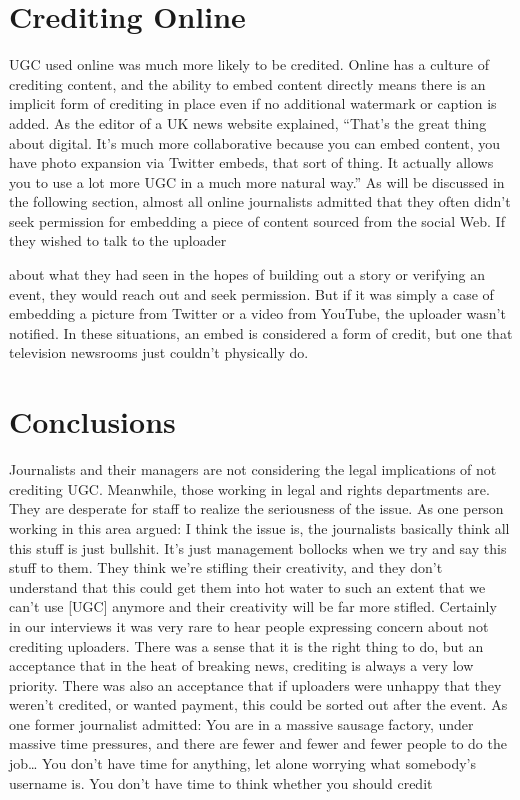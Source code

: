 \begin{enumerate}
\section{Crediting Online}
UGC used online was much more likely to be credited. Online has a culture
of crediting content, and the ability to embed content directly means there
is an implicit form of crediting in place even if no additional watermark or
caption is added.
As the editor of a UK news website explained, ``That's the great thing about
digital. It's much more collaborative because you can embed content, you
have photo expansion via Twitter embeds, that sort of thing. It actually
allows you to use a lot more UGC in a much more natural way.''
As will be discussed in the following section, almost all online journalists
admitted that they often didn't seek permission for embedding a piece of
content sourced from the social Web. If they wished to talk to the uploader

about what they had seen in the hopes of building out a story or verifying an
event, they would reach out and seek permission. But if it was simply a case
of embedding a picture from Twitter or a video from YouTube, the uploader
wasn't notified. In these situations, an embed is considered a form of credit,
but one that television newsrooms just couldn't physically do.
\section{Conclusions}
Journalists and their managers are not considering the legal implications of
not crediting UGC. Meanwhile, those working in legal and rights departments
are. They are desperate for staff to realize the seriousness of the issue.
As one person working in this area argued:
I think the issue is, the journalists basically think all this stuff is just
bullshit. It's just management bollocks when we try and say this stuff
to them. They think we're stifling their creativity, and they don't
understand that this could get them into hot water to such an extent
that we can't use [UGC] anymore and their creativity will be far
more stifled.
Certainly in our interviews it was very rare to hear people expressing concern
about not crediting uploaders. There was a sense that it is the right
thing to do, but an acceptance that in the heat of breaking news, crediting
is always a very low priority. There was also an acceptance that if uploaders
were unhappy that they weren't credited, or wanted payment, this could be
sorted out after the event. As one former journalist admitted:
You are in a massive sausage factory, under massive time pressures,
and there are fewer and fewer and fewer people to do the job… You
don't have time for anything, let alone worrying what somebody's
username is. You don't have time to think whether you should credit


\end{enumerate}

